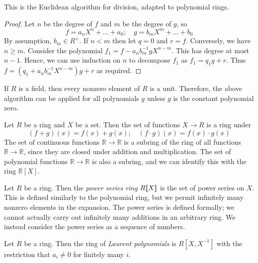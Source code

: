 \begin{remark}
	This is the Euclidean algorithm for division, adapted to polynomial rings.
\end{remark}
\begin{proof}
	Let \( n \) be the degree of \( f \) and \( m \) be the degree of \( g \), so
	\[ f = a_n X^n + \dots + a_0;\quad g = b_m X^m + \dots + b_0 \]
	By assumption, \( b_m \in R^\times \).
	If \( n < m \) then let \( q = 0 \) and \( r = f \).
	Conversely, we have \( n \geq m \).
	Consider the polynomial \( f_1 = f - a_n b_m^{-1} g X^{n-m} \).
	This has degree at most \( n - 1 \).
	Hence, we can use induction on \( n \) to decompose \( f_1 \) as \( f_1 = q_1 g + r \).
	Thus \( f = (q_1 + a_n b_m^{-1} X^{n-m}) g + r \) as required.
\end{proof}
\begin{remark}
	If \( R \) is a field, then every nonzero element of \( R \) is a unit.
	Therefore, the above algorithm can be applied for all polynomials \( g \) unless \( g \) is the constant polynomial zero.
\end{remark}
\begin{example}
	Let \( R \) be a ring and \( X \) be a set.
	Then the set of functions \( X \to R \) is a ring under
	\[ (f + g)(x) = f(x) + g(x);\quad (f \cdot g)(x) = f(x) \cdot g(x) \]
	The set of continuous functions \( \mathbb R \to \mathbb R \) is a subring of the ring of all functions \( \mathbb R \to \mathbb R \), since they are closed under addition and multiplication.
	The set of polynomial functions \( \mathbb R \to \mathbb R \) is also a subring, and we can identify this with the ring \( \mathbb R[X] \).
\end{example}
\begin{example}
	Let \( R \) be a ring.
	Then the \textit{power series ring} \( R[\![X]\!] \) is the set of power series on \( X \).
	This is defined similarly to the polynomial ring, but we permit infinitely many nonzero elements in the expansion.
	The power series is defined formally; we cannot actually carry out infinitely many additions in an arbitrary ring.
	We instead consider the power series as a sequence of numbers.
\end{example}
\begin{example}
	Let \( R \) be a ring.
	Then the ring of \textit{Laurent polynomials} is \( R[X,X^{-1}] \) with the restriction that \( a_i \neq 0 \) for finitely many \( i \).
\end{example}

